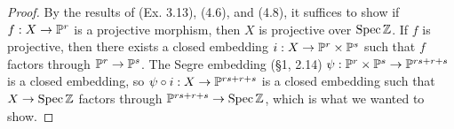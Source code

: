 \documentclass{article}
\begin{document}
\begin{enumerate} [label=\textbf{\arabic*.}, leftmargin=0em]
\begin{proof}
    By the results of (Ex. 3.13), (4.6), and (4.8), it suffices to show if $f : X \to \mathbb{P}^r$ is a projective morphism, then $X$ is projective over $\operatorname{Spec}{\mathbb{Z}}$. If $f$ is projective, then there exists a closed embedding $i : X \to \mathbb{P}^r \times \mathbb{P}^s$ such that $f$ factors through $\mathbb{P}^r \to \mathbb{P}^s$. The Segre embedding (\S 1, 2.14) $\psi : \mathbb{P}^r \times \mathbb{P}^s \to \mathbb{P}^{rs + r + s}$ is a closed embedding, so $\psi \circ i : X \to \mathbb{P}^{rs + r + s}$ is a closed embedding such that $X \to \operatorname{Spec}{\mathbb{Z}}$ factors through $\mathbb{P}^{rs + r + s} \to \operatorname{Spec}{\mathbb{Z}}$, which is what we wanted to show.
\end{proof}

\end{enumerate}
\end{document}
